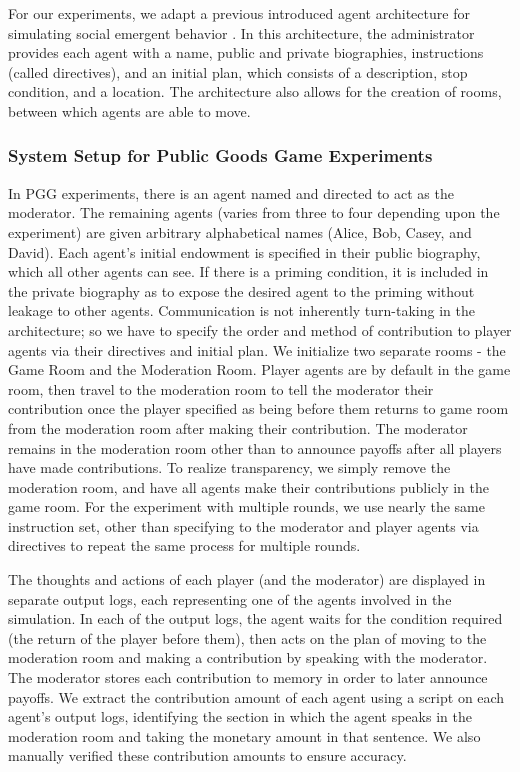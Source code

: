 For our experiments, we adapt a previous introduced agent architecture for simulating social emergent behavior \cite{park2023generativeagentsinteractivesimulacra}. In this architecture, the administrator provides each agent with a name, public and private biographies, instructions (called directives), and an initial plan, which consists of a description, stop condition, and a location. The architecture also allows for the creation of rooms, between which agents are able to move. 

\subsubsection{System Setup for Public Goods Game Experiments}

In PGG experiments, there is an agent named and directed to act as the moderator. The remaining agents (varies from three to four depending upon the experiment) are given arbitrary alphabetical names (Alice, Bob, Casey, and David). Each agent's initial endowment is specified in their public biography, which all other agents can see. If there is a priming condition, it is included in the private biography as to expose the desired agent to the priming without leakage to other agents. Communication is not inherently turn-taking in the architecture; so we have to specify the order and method of contribution to player agents via their directives and initial plan. We initialize two separate rooms - the Game Room and the Moderation Room. Player agents are by default in the game room, then travel to the moderation room to tell the moderator their contribution once the player specified as being before them returns to game room from the moderation room after making their contribution. The moderator remains in the moderation room other than to announce payoffs after all players have made contributions. To realize transparency, we simply remove the moderation room, and have all agents make their contributions publicly in the game room. For the experiment with multiple rounds, we use nearly the same instruction set, other than specifying to the moderator and player agents via directives to repeat the same process for multiple rounds.

The thoughts and actions of each player (and the moderator) are displayed in separate output logs, each representing one of the agents involved in the simulation. In each of the output logs, the agent waits for the condition required (the return of the player before them), then acts on the plan of moving to the moderation room and making a contribution by speaking with the moderator. The moderator stores each contribution to memory in order to later announce payoffs. We extract the contribution amount of each agent using a script on each agent's output logs, identifying the section in which the agent speaks in the moderation room and taking the monetary amount in that sentence. We also manually verified these contribution amounts to ensure accuracy.

